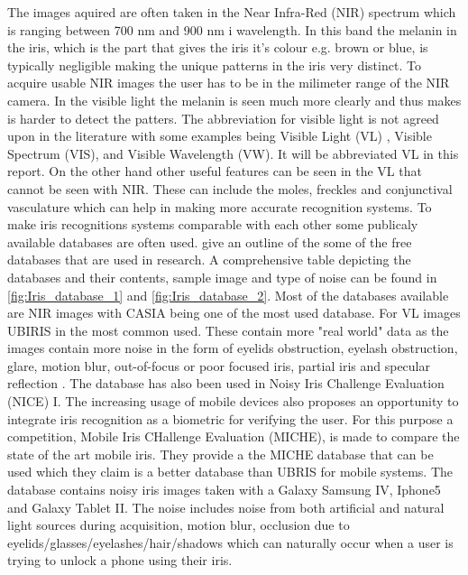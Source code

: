 The images aquired are often taken in the Near Infra-Red (NIR) spectrum which is ranging between 700 nm and 900 nm i wavelength. In this band the melanin in the iris, which is the part that gives the iris it's colour e.g. brown or blue, is typically negligible making the unique patterns in the iris very distinct. To acquire usable NIR images the user has to be in the milimeter range of the NIR camera.  In the visible light the melanin is seen much more clearly and thus makes is harder to detect the patters. The abbreviation for visible light is not agreed upon in the literature with some examples being Visible Light (VL) , Visible Spectrum (VIS), and Visible Wavelength (VW). It will be abbreviated VL  in this report. On the other hand other useful features can be seen in the VL that cannot be seen with NIR. These can include the moles, freckles and conjunctival vasculature which can help in making more accurate recognition systems. To make iris recognitions systems comparable with each other some publicaly available databases are often used. \cite{RifaeeMustafaandAbdallahMohammadandOkosh2017}  give an outline of the some of the free databases that are used in research. A comprehensive table depicting the databases and their contents, sample image and type of noise can be found in \autoref{fig:Iris_database_1} and \autoref{fig:Iris_database_2}. Most of the databases available are NIR images with CASIA being one of the most used database. For VL images UBIRIS in the most common used.  These contain more "real world" data as the images contain more noise in the form of eyelids obstruction, eyelash obstruction, glare, motion blur, out-of-focus or poor focused iris, partial iris and specular reflection \citep{Rattani2017}. The database has also been used in Noisy Iris Challenge Evaluation (NICE) I. The increasing usage of mobile devices also proposes an opportunity to integrate iris recognition as a biometric for verifying the user.  For this purpose a competition, Mobile Iris CHallenge Evaluation (MICHE), is made to compare the state of the art mobile iris. They provide a the MICHE database that can be used which they claim is a better database than UBRIS for mobile systems. The database contains noisy iris images taken with a Galaxy Samsung IV, Iphone5 and Galaxy Tablet II. The noise includes noise from both artificial and natural light sources during acquisition, motion blur, occlusion due to eyelids/glasses/eyelashes/hair/shadows which can naturally occur when a user is trying to unlock a phone using their iris. 

